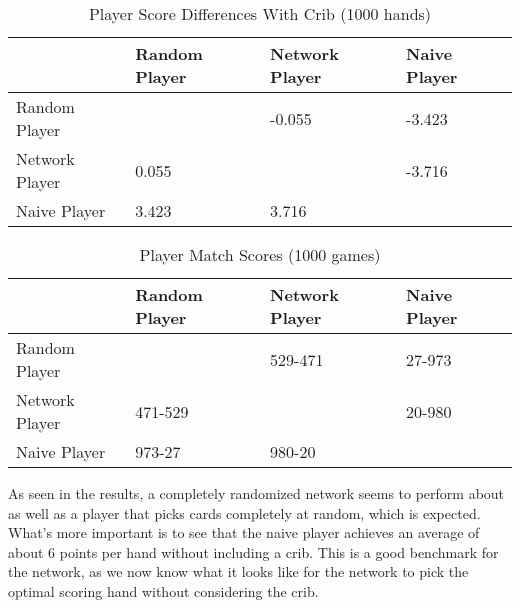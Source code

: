 \documentclass[]{article}
\begin{document}
\begin{table}[ht]
    \caption {Player Score Differences With Crib (1000 hands)} \label{tbl:score_diffs}
    \begin{tabular}{l|l|l|l|}
    \cline{2-4}
                                         & Random Player                                   & Network Player           & Naive Player             \\ \hline
    \multicolumn{1}{|l|}{Random Player}  & \cellcolor[HTML]{000000}                        & -0.055                   & -3.423                   \\ \hline
    \multicolumn{1}{|l|}{Network Player} & 0.055                                           & \cellcolor[HTML]{000000} & -3.716                   \\ \hline
    \multicolumn{1}{|l|}{Naive Player}   & 3.423                                           & 3.716                    & \cellcolor[HTML]{000000} \\ \hline
    \end{tabular}
\end{table}

\begin{table}[ht]
    \caption {Player Match Scores (1000 games)} \label{tbl:match_scores}
    \begin{tabular}{l|l|l|l|}
    \cline{2-4}
                                         & Random Player                                   & Network Player           & Naive Player             \\ \hline
    \multicolumn{1}{|l|}{Random Player}  & \cellcolor[HTML]{000000}                        & 529-471                  & 27-973                   \\ \hline
    \multicolumn{1}{|l|}{Network Player} & 471-529                                         & \cellcolor[HTML]{000000} & 20-980                   \\ \hline
    \multicolumn{1}{|l|}{Naive Player}   & 973-27                                          & 980-20                   & \cellcolor[HTML]{000000} \\ \hline
    \end{tabular}
\end{table}

As seen in the results, a completely randomized network seems to perform about as well as a player that picks cards completely at random, which is expected. What's more important is to see that the naive player achieves an average of about 6 points per hand without including a crib. This is a good benchmark for the network, as we now know what it looks like for the network to pick the optimal scoring hand without considering the crib.
\end{document}
